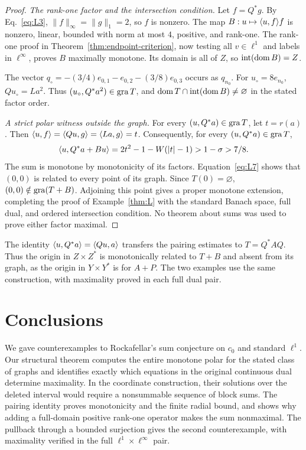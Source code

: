 \begin{proof}
\noindent\textit{The rank-one factor and the intersection condition.}
\label{sec:L4}
Let $f=Q^*g$. By Eq.~\eqref{eq:L3}, $\|f\|_\infty=\|g\|_1=2$, so $f$
is nonzero. The map $B:u\mapsto\langle u,f\rangle f$ is nonzero, linear, bounded
with norm at most $4$, positive, and rank-one. The rank-one proof in
Theorem~\ref{thm:endpoint-criterion}, now testing all $v\in\ell^1$
and labels in $\ell^\infty$, proves $B$ maximally monotone.
Its domain is all of $Z$, so $\operatorname{int}(\operatorname{dom} B)=Z$.

The vector $q_\circ=-(3/4)e_{0,1}-e_{0,2}-(3/8)e_{0,3}$ occurs as
$q_{n_0}$. For $u_\circ=8e_{n_0}$, $Qu_\circ=La^2$.
Thus $(u_\circ,Q^*a^2)\in\operatorname{gra} T$, and
$\operatorname{dom} T\cap\operatorname{int}(\operatorname{dom} B)\ne\varnothing$ in the stated
factor order.

\noindent\textit{A strict polar witness outside the graph.}
\label{sec:L5}
For every $(u,Q^*a)\in\operatorname{gra} T$, let $t=r(a)$. Then
$\langle u,f\rangle=\langle Qu,g\rangle=\langle La,g\rangle=t$.
Consequently, for every $(u,Q^*a)\in\operatorname{gra} T$,
\begin{equation}
\langle u,Q^*a+Bu\rangle
 =2t^2-1-W(|t|-1)>1-\sigma>7/8.
\label{eq:L7}
\end{equation}
The sum is monotone by monotonicity of its factors.
Equation~\eqref{eq:L7} shows that $(0,0)$ is related to every point of its graph.
Since $T(0)=\varnothing$, $(0,0)\notin\operatorname{gra}(T+B)$. Adjoining this point
gives a proper monotone extension, completing the proof of
Example~\ref{thm:L} with the standard Banach space, full dual, and ordered
intersection condition. No theorem about sums was used to prove either
factor maximal.
\end{proof}

The identity $\langle u,Q^*a\rangle=\langle Qu,a\rangle$ transfers the pairing
estimates to $T=Q^*AQ$. Thus the origin in $Z\times Z^*$ is
monotonically related to $T+B$ and absent from its graph, as the origin
in $Y\times Y^*$ is for $A+P$. The two examples use the same
construction, with maximality proved in each full dual pair.

\section{Conclusions}
\label{sec:conclusion}

We gave counterexamples to Rockafellar's sum conjecture on $c_0$ and
standard $\ell^1$. Our structural theorem computes the entire monotone
polar for the stated class of graphs and identifies exactly which
equations in the original continuous dual determine maximality. In the
coordinate construction, their solutions over the deleted interval
would require a nonsummable sequence of block sums. The pairing identity
proves monotonicity and the finite radial bound, and shows why adding
a full-domain positive rank-one operator makes the sum nonmaximal.
The pullback through a bounded surjection gives the second counterexample,
with maximality verified in the full $\ell^1\times\ell^\infty$ pair.


